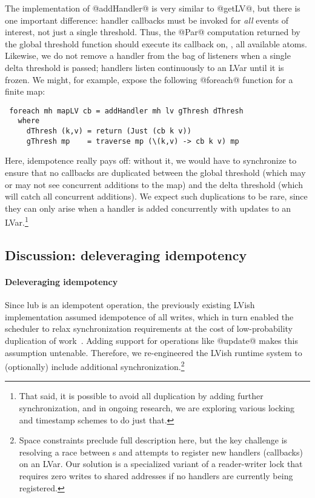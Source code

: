 The implementation of @addHandler@ is very similar to @getLV@, but there is one
important difference: handler callbacks must be invoked for \emph{all} events of
interest, not just a single threshold.  Thus, the @Par@ computation returned by
the global threshold function should execute its callback on, \eg, all available
atoms.  Likewise, we do not remove a handler from the bag of listeners when a
single delta threshold is passed; handlers listen continuously to an LVar until
it is frozen.  We might, for example, expose the following @foreach@ function
for a finite map:
\begin{lstlisting}
 foreach mh mapLV cb = addHandler mh lv gThresh dThresh
   where
     dThresh (k,v) = return (Just (cb k v))
     gThresh mp    = traverse mp (\(k,v) -> cb k v) mp
\end{lstlisting}
Here, idempotence really pays off: without it, we would have to synchronize to
ensure that no callbacks are duplicated between the global threshold (which may
or may not see concurrent additions to the map) and the delta threshold (which
will catch all concurrent additions).  We expect such duplications to be rare,
since they can only arise when a handler is added concurrently with updates to
an LVar.\footnote{That said, it is possible to avoid all duplication by adding
  further synchronization, and in ongoing research, we are exploring various
  locking and timestamp schemes to do just that.}

\subsection{Discussion: deleveraging idempotency}

\paragraph{Deleveraging idempotency}\label{s:dedup}

Since lub is an idempotent operation, the previously existing LVish
implementation assumed idempotence of all writes, which in turn
enabled the scheduler to relax synchronization requirements at the
cost of low-probability duplication of
work~\cite{Freeze-paper}. Adding support for operations like @update@
makes this assumption untenable.  Therefore, we re-engineered the
LVish runtime system to (optionally) include additional
synchronization.\footnote{Space constraints preclude full description
  here, but the key challenge is resolving a race between s
  and attempts to register new handlers (callbacks) on an LVar.  Our
  solution is a specialized variant of a reader-writer lock that
  requires zero writes to shared addresses if no handlers are
  currently being registered.}

